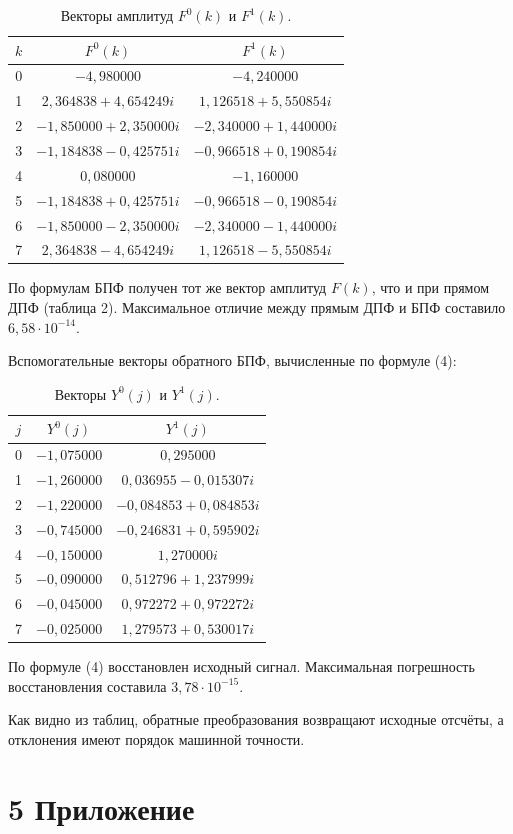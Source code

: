 \documentclass[14pt,a4paper]{extarticle}
\begin{document}
\begin{table}[H]
\centering
\caption{Векторы амплитуд $F^0(k)$ и $F^1(k)$.}
\small
\begin{tabular}{|c|c|c|}
\hline
$k$ & $F^0(k)$ & $F^1(k)$ \\ \hline
0 & $-4{,}980000$ & $-4{,}240000$ \\ \hline
1 & $2{,}364838+4{,}654249i$ & $1{,}126518+5{,}550854i$ \\ \hline
2 & $-1{,}850000+2{,}350000i$ & $-2{,}340000+1{,}440000i$ \\ \hline
3 & $-1{,}184838-0{,}425751i$ & $-0{,}966518+0{,}190854i$ \\ \hline
4 & $0{,}080000$ & $-1{,}160000$ \\ \hline
5 & $-1{,}184838+0{,}425751i$ & $-0{,}966518-0{,}190854i$ \\ \hline
6 & $-1{,}850000-2{,}350000i$ & $-2{,}340000-1{,}440000i$ \\ \hline
7 & $2{,}364838-4{,}654249i$ & $1{,}126518-5{,}550854i$ \\ \hline
\end{tabular}
\end{table}

По формулам БПФ получен тот же вектор амплитуд $F(k)$, что и при прямом ДПФ (таблица 2). Максимальное отличие между прямым ДПФ и БПФ составило $6{,}58\cdot10^{-14}$.

Вспомогательные векторы обратного БПФ, вычисленные по формуле (4):
\begin{table}[H]
\centering
\caption{Векторы $Y^0(j)$ и $Y^1(j)$.}
\small
\begin{tabular}{|c|c|c|}
\hline
$j$ & $Y^0(j)$ & $Y^1(j)$ \\ \hline
0 & $-1{,}075000$ & $0{,}295000$ \\ \hline
1 & $-1{,}260000$ & $0{,}036955-0{,}015307i$ \\ \hline
2 & $-1{,}220000$ & $-0{,}084853+0{,}084853i$ \\ \hline
3 & $-0{,}745000$ & $-0{,}246831+0{,}595902i$ \\ \hline
4 & $-0{,}150000$ & $1{,}270000i$ \\ \hline
5 & $-0{,}090000$ & $0{,}512796+1{,}237999i$ \\ \hline
6 & $-0{,}045000$ & $0{,}972272+0{,}972272i$ \\ \hline
7 & $-0{,}025000$ & $1{,}279573+0{,}530017i$ \\ \hline
\end{tabular}
\end{table}

По формуле (4) восстановлен исходный сигнал. Максимальная погрешность восстановления составила $3{,}78\cdot10^{-15}$.

Как видно из таблиц, обратные преобразования возвращают исходные отсчёты, а отклонения имеют порядок машинной точности.

\newpage

\section*{5 Приложение}

\end{document}
